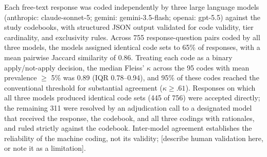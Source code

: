 Each free-text response was coded independently by three large language models
(anthropic: claude-sonnet-5; gemini: gemini-3.5-flash; openai: gpt-5.5) against the study codebooks, with structured JSON
output validated for code validity, tier cardinality, and exclusivity rules.
Across 755 response-question pairs coded by all three models, the models
assigned identical code sets to 65\% of responses, with a mean
pairwise Jaccard similarity of 0.86. Treating each code as a binary
apply/not-apply decision, the median Fleiss' $\kappa$ across the
95 codes with mean prevalence $\geq$ 5\% was
0.89 (IQR 0.78--0.94),
and 95\% of these codes reached the conventional
threshold for substantial agreement ($\kappa \geq .61$).
Responses on which all three models produced identical code sets (445 of 756) were accepted directly; the remaining 311 were resolved by an adjudication call to a designated model that received the response, the codebook, and all three codings with rationales, and ruled strictly against the codebook. Inter-model agreement establishes the reliability of the machine
coding, not its validity; [describe human validation here, or note it as a
limitation].
